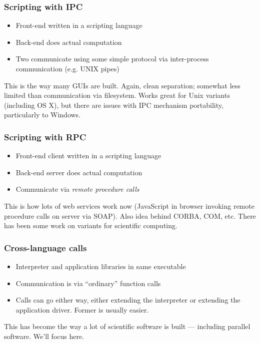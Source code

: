 \documentclass{beamer}
\begin{document}
\begin{frame}
  \frametitle{Scripting with IPC}

  \begin{itemize}
  \item Front-end written in a scripting language
  \item Back-end does actual computation
  \item Two communicate using some simple protocol 
    via inter-process communication (e.g. UNIX pipes)
  \end{itemize}

  \vspace{1cm}
  This is the way many GUIs are built.  Again, clean separation;
  somewhat less limited than communication via filesystem.  Works
  great for Unix variants (including OS X), but there are issues with
  IPC mechanism portability, particularly to Windows.

\end{frame}


\begin{frame}
  \frametitle{Scripting with RPC}

  \begin{itemize}
  \item Front-end client written in a scripting language
  \item Back-end server does actual computation
  \item Communicate via {\em remote procedure calls}
  \end{itemize}

  \vspace{1cm}
  This is how lots of web services work now (JavaScript in browser
  invoking remote procedure calls on server via SOAP).  Also idea
  behind CORBA, COM, etc.  There has been some work on variants for
  scientific computing.

\end{frame}


\begin{frame}
  \frametitle{Cross-language calls}

  \begin{itemize}
  \item Interpreter and application libraries in same executable
  \item Communication is via ``ordinary'' function calls
  \item Calls can go either way, either extending the interpreter
    or extending the application driver.  Former is usually easier.
  \end{itemize}

  \vspace{1cm}
  This has become the way a lot of scientific software is built ---
  including parallel software.  We'll focus here.

\end{frame}
\end{document}
